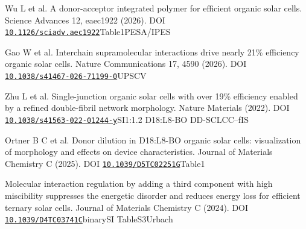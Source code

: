 \documentclass[11pt,a4paper]{article}
\makeatletter
\renewenvironment{thebibliography}[1]
 {\list{\@biblabel{\@arabic\c@enumiv}}{\settowidth\labelwidth{\@biblabel{#1}}\leftmargin\labelwidth\advance\leftmargin\labelsep\usecounter{enumiv}\setlength\itemsep{.4em}\setlength\parsep{0pt}}\sloppy}
 {\endlist}
\makeatother
\begin{document}
\begin{thebibliography}{R20}
\par
 Wu L et al. A donor-acceptor integrated polymer for efficient organic solar cells. Science Advances 12, eaec1922 (2026). DOI \href{https://doi.org/10.1126/sciadv.aec1922}{\nolinkurl{10.1126/sciadv.aec1922}}\allowbreak{}Table1\allowbreak{}PESA/IPES\allowbreak{}
\par
 Gao W et al. Interchain supramolecular interactions drive nearly 21\% efficiency organic solar cells. Nature Communications 17, 4590 (2026). DOI \href{https://doi.org/10.1038/s41467-026-71199-0}{\nolinkurl{10.1038/s41467-026-71199-0}}\allowbreak{}UPS\allowbreak{}CV\allowbreak{}
\par
 Zhu L et al. Single-junction organic solar cells with over 19\% efficiency enabled by a refined double-fibril network morphology. Nature Materials (2022). DOI \href{https://doi.org/10.1038/s41563-022-01244-y}{\nolinkurl{10.1038/s41563-022-01244-y}}\allowbreak{}SI\allowbreak{}1:1.2 D18:L8-BO DD-SCLC\allowbreak{}C–f\allowbreak{}IS\allowbreak{}
\par
 Ortner B C et al. Donor dilution in D18:L8-BO organic solar cells: visualization of morphology and effects on device characteristics. Journal of Materials Chemistry C (2025). DOI \href{https://doi.org/10.1039/D5TC02251G}{\nolinkurl{10.1039/D5TC02251G}}\allowbreak{}Table1\allowbreak{}
\par
 Molecular interaction regulation by adding a third component with high miscibility suppresses the energetic disorder and reduces energy loss for efficient ternary solar cells. Journal of Materials Chemistry C (2024). DOI \href{https://doi.org/10.1039/D4TC03741C}{\nolinkurl{10.1039/D4TC03741C}}\allowbreak{}binary\allowbreak{}SI TableS3\allowbreak{}Urbach\allowbreak{}

\end{thebibliography}
\end{document}
